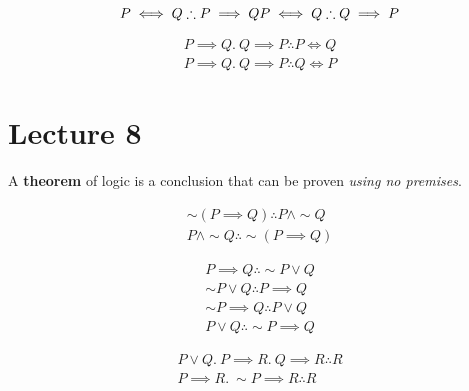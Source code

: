 \documentclass[11pt]{article}
\begin{document}
		\begin{rules}
			\begin{equation}
				P \iff Q \therefore P \implies Q \\
				P \iff Q \therefore Q \implies P
			\end{equation}
		\end{rules}
		
		\begin{rules}
			\begin{gather}
				P \implies Q.\ Q \implies P \therefore P \iff Q \\
				P \implies Q.\ Q \implies P \therefore Q \iff P
			\end{gather}
		\end{rules}
	
	\section{Lecture 8}
		\begin{definition}
			A \textbf{theorem} of logic is a conclusion that can be proven \emph{using no premises}.
		\end{definition}
		
		\begin{rules}
		\begin{gather}
			\sim (P \implies Q) \therefore P \land \sim Q \\
			P \land \sim Q \therefore \sim (P \implies Q)
		\end{gather}
		\end{rules}
		
		\begin{rules}
			\begin{gather}
				P \implies Q \therefore \sim P \lor Q \\
				\sim P \lor Q \therefore P \implies Q \\
				\sim P \implies Q \therefore P \lor Q \\
				P \lor Q \therefore \sim P \implies Q
			\end{gather}
		\end{rules}
		
		\begin{rules}
			\begin{gather}
				P \lor Q.\ P \implies R.\ Q \implies R \therefore R \\
				P \implies R.\ \sim P \implies R \therefore R
			\end{gather}
		\end{rules}
		
\end{document}
